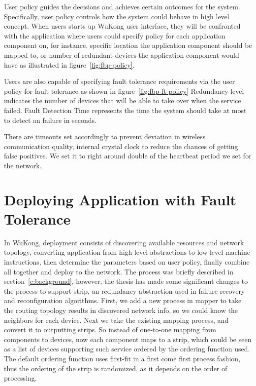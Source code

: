 User policy guides the decisions and achieves certain outcomes for the system.
Specifically, user policy controls how the system could behave in high level
concept.
When users starts up WuKong user interface, they will be confronted with the
application where users could specify policy for each application component on,
for instance, specific location the application component should be mapped to,
or number of redundant devices the application component would have as
illustrated in figure~\ref{fig:fbp-policy}.

Users are also capable of specifying fault tolerance requirements via the
user policy for fault tolerance as shown in figure~\ref{fig:fbp-ft-policy}
Redundancy level indicates the number of devices that will be able to take over
when the service failed. Fault Detection Time represents the time the system
should take at most to detect an failure in seconds.

There are timeouts set accordingly to prevent deviation in wireless communication quality,
internal crystal clock to reduce the chances of getting false positives. 
We set it to right around double of the heartbeat period we set for the network.

\section{Deploying Application with Fault Tolerance}

In WuKong, deployment consists of discovering available resources and network
topology, converting application from high-level abstractions to low-level
machine instructions, then determine the parameters based on user policy,
finally combine all together and deploy to the network. The process was briefly
described in section~\ref{c:background}, however, the thesis has made some
significant changes to the process to support strip, an redundancy abstraction
used in failure recovery and reconfiguration algorithms. First, we add a new
process in mapper to take the routing topology results in discovered network
info, so we could know the neighbors for each device. Next we take the existing
mapping process, and convert it to outputting strips. So instead of one-to-one
mapping from components to devices, now each component maps to a strip, which
could be seen as a list of devices supporting such service ordered by the
ordering function used. The default ordering function uses first-fit in a first
come first process fashion, thus the ordering of the strip is randomized, as it
depends on the order of processing.

